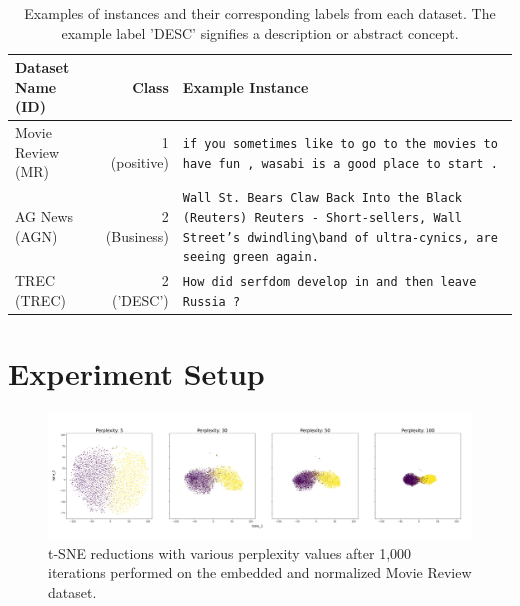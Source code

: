 \documentclass[english,bachelor,ul]{webisthesis} %
\begin{document}
\begin{table}[htbp]
    \centering
    \renewcommand{\arraystretch}{1.5}
    \begin{tabular}{@{}lrp{7cm}@{}} 
        \toprule
        \textbf{Dataset Name} \scriptsize (ID) & \textbf{Class} & \textbf{Example Instance} \\
        \midrule
        Movie Review \scriptsize (MR) & 1 (positive) & \texttt{if you sometimes like to go to the movies to have fun , wasabi is a good place to start .} \\
        AG News \scriptsize (AGN) & 2  (Business) & \texttt{Wall St. Bears Claw Back Into the Black (Reuters) Reuters - Short-sellers, Wall Street's dwindling\textbackslash band of ultra-cynics, are seeing green again.} \\
        TREC \scriptsize (TREC) & 2 ('DESC') & \texttt{How did serfdom develop in and then leave Russia ?} \\
        \bottomrule
    \end{tabular}
    \caption{Examples of instances and their corresponding labels from each dataset. The example label 'DESC' signifies a description or abstract concept.}
    \label{tab:dataset-instances}
\end{table}

\section{Experiment Setup}



\iffalse
\begin{figure}[htbp]
    \centering
    \includegraphics[width=1\textwidth]{img/reductions-mr-1000.jpg}
    \caption{t-SNE reductions with various perplexity values after 1,000 iterations performed on the embedded and normalized Movie Review dataset.}
    \label{fig:reductions-mr-1000}
\end{figure}
\end{document}
